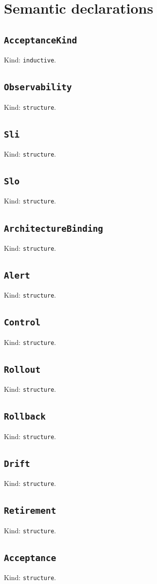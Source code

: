 \documentclass[11pt]{article}
\begin{document}
\section*{Semantic declarations}
\subsection*{\texttt{AcceptanceKind}}
\noindent Kind: \texttt{inductive}.\par
\subsection*{\texttt{Observability}}
\noindent Kind: \texttt{structure}.\par
\subsection*{\texttt{Sli}}
\noindent Kind: \texttt{structure}.\par
\subsection*{\texttt{Slo}}
\noindent Kind: \texttt{structure}.\par
\subsection*{\texttt{ArchitectureBinding}}
\noindent Kind: \texttt{structure}.\par
\subsection*{\texttt{Alert}}
\noindent Kind: \texttt{structure}.\par
\subsection*{\texttt{Control}}
\noindent Kind: \texttt{structure}.\par
\subsection*{\texttt{Rollout}}
\noindent Kind: \texttt{structure}.\par
\subsection*{\texttt{Rollback}}
\noindent Kind: \texttt{structure}.\par
\subsection*{\texttt{Drift}}
\noindent Kind: \texttt{structure}.\par
\subsection*{\texttt{Retirement}}
\noindent Kind: \texttt{structure}.\par
\subsection*{\texttt{Acceptance}}
\noindent Kind: \texttt{structure}.\par
\end{document}

